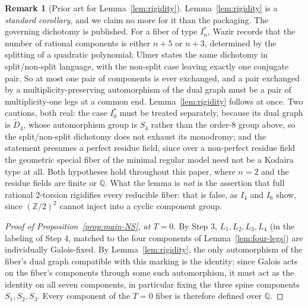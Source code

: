 \documentclass[11pt]{amsart}
\theoremstyle{definition}
\newtheorem{remark}[theorem]{Remark}
\newcommand{\Q}{\mathbb{Q}}
\newcommand{\Z}{\mathbb{Z}}
\begin{document}
\begin{remark}[Prior art for Lemma~\ref{lem:rigidity}]
\label{rem:rigidity-prior-art}
Lemma~\ref{lem:rigidity} is a \emph{standard corollary}, and we claim no
more for it than the packaging. The governing dichotomy is published. For
a fiber of type $I_n^*$, Wazir \cite{Wazir2004} records that the number of
rational components is either $n+5$ or $n+3$, determined by the splitting
of a quadratic polynomial; Ulmer \cite{Ulmer2011} states the same
dichotomy in split/non-split language, with the non-split case leaving
exactly one conjugate pair. So at most one pair of components is ever
exchanged, and a pair exchanged by a multiplicity-preserving automorphism
of the dual graph must be a pair of multiplicity-one legs at a common end.
Lemma~\ref{lem:rigidity} follows at once. Two cautions, both real: the
case $I_0^*$ must be treated separately, because its dual graph is
$\widetilde{D}_4$, whose automorphism group is $S_4$ rather than the
order-$8$ group above, so the split/non-split dichotomy does not exhaust
its monodromy; and the statement presumes a perfect residue field, since
over a non-perfect residue field the geometric special fiber of the
minimal regular model need not be a Kodaira type at all. Both hypotheses
hold throughout this paper, where $n=2$ and the residue fields are finite
or $\Q$. What the lemma is \emph{not} is the assertion that full rational
$2$-torsion rigidifies every reducible fiber: that is false, as $I_4$ and
$I_6$ show, since $(\Z/2)^2$ cannot inject into a cyclic component group.
\end{remark}

\begin{proof}[Proof of Proposition~\ref{prop:main-NS}, at $T=0$]
By Step 3, $L_1,L_2,L_3,L_4$ (in the labeling of Step 4, matched to the
four components of Lemma~\ref{lem:four-legs}) are individually
Galois-fixed. By Lemma~\ref{lem:rigidity}, the only automorphism of the
fiber's dual graph compatible with this marking is the identity; since
Galois acts on the fiber's components through some such automorphism, it
must act as the identity on all seven components, in particular fixing
the three spine components $S_1,S_2,S_3$. Every component of the $T=0$
fiber is therefore defined over $\Q$.
\end{proof}
\end{document}

